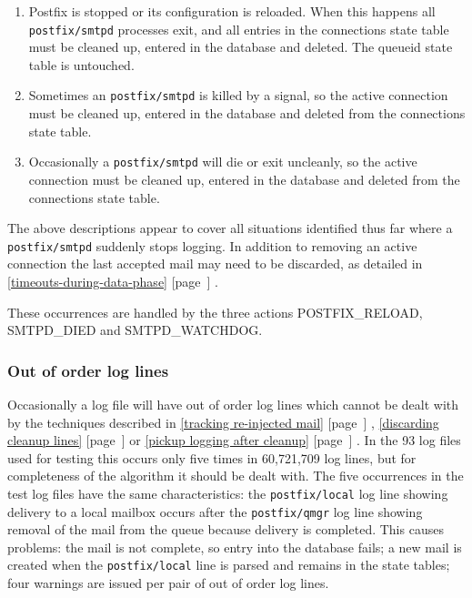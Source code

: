 \documentclass[a4paper,12pt,draft]{article}
\newcommand{\refwithpage}[1]{%
    \empty{}\ref{#1} [page~\pageref{#1}]%
}
\newcommand{\sectionref}[1]{%
    \textsection{}\refwithpage{#1}%
}
\newcommand{\daemon}[1]{%
    \texttt{postfix/#1}%
}
\newcommand{\numberOFlogFILES}[0]{%
    93%
}
\begin{document}
\begin{enumerate}

    \item Postfix is stopped or its configuration is reloaded.  When this
        happens all \daemon{smtpd} processes exit, and all entries in the
        connections state table must be cleaned up, entered in the database
        and deleted.  The queueid state table is untouched.

    \item Sometimes an \daemon{smtpd} is killed by a signal, so the active
        connection must be cleaned up, entered in the database and deleted
        from the connections state table.

    \item Occasionally a \daemon{smtpd} will die or exit uncleanly, so the
        active connection must be cleaned up, entered in the database and
        deleted from the connections state table.

\end{enumerate}

The above descriptions appear to cover all situations identified thus far
where a \daemon{smtpd} suddenly stops logging.  In addition to removing an
active connection the last accepted mail may need to be discarded, as
detailed in \sectionref{timeouts-during-data-phase}.

These occurrences are handled by the three actions POSTFIX\_RELOAD,
SMTPD\_DIED and SMTPD\_WATCHDOG\@.

\subsubsection{Out of order log lines}

\label{out of order log lines}

Occasionally a log file will have out of order log lines which cannot be
dealt with by the techniques described in \sectionref{tracking re-injected
mail}, \sectionref{discarding cleanup lines} or \sectionref{pickup logging
after cleanup}.  In the \numberOFlogFILES{} log files used for testing this
occurs only five times in 60,721,709 log lines, but for completeness of the
algorithm it should be dealt with.  The five occurrences in the test log
files have the same characteristics: the \daemon{local} log line showing
delivery to a local mailbox occurs after the \daemon{qmgr} log line showing
removal of the mail from the queue because delivery is completed.  This
causes problems: the mail is not complete, so entry into the database
fails; a new mail is created when the \daemon{local} line is parsed and
remains in the state tables; four warnings are issued per pair of out of
order log lines.
\end{document}

